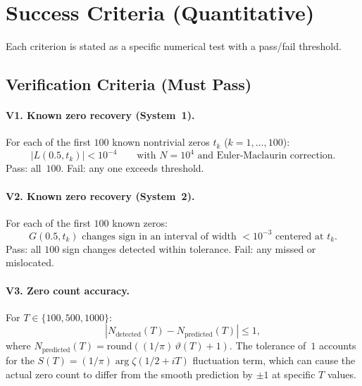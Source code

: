 \section{Success Criteria (Quantitative)}
\label{sec:criteria}

Each criterion is stated as a specific numerical test with a pass/fail threshold.


\subsection{Verification Criteria (Must Pass)}
\label{sec:verification}

\paragraph{V1. Known zero recovery (System~1).}
For each of the first $100$ known nontrivial zeros $t_k$ ($k = 1, \ldots, 100$):
\begin{equation}\label{eq:V1}
  |L(0.5, t_k)| < 10^{-4} \qquad \text{with } N = 10^4
  \text{ and Euler-Maclaurin correction.}
\end{equation}
Pass: all~$100$. Fail: any one exceeds threshold.

\paragraph{V2. Known zero recovery (System~2).}
For each of the first $100$ known zeros:
\begin{equation}\label{eq:V2}
  G(0.5, t_k) \text{ changes sign in an interval of width } < 10^{-3}
  \text{ centered at } t_k.
\end{equation}
Pass: all $100$ sign changes detected within tolerance. Fail: any missed or mislocated.

\paragraph{V3. Zero count accuracy.}
For $T \in \{100, 500, 1000\}$:
\begin{equation}\label{eq:V3}
  |N_{\mathrm{detected}}(T) - N_{\mathrm{predicted}}(T)| \le 1,
\end{equation}
where $N_{\mathrm{predicted}}(T) = \mathrm{round}((1/\pi)\,\vartheta(T) + 1)$. The
tolerance of~$1$ accounts for the $S(T) = (1/\pi)\arg\zeta(1/2 + iT)$ fluctuation term,
which can cause the actual zero count to differ from the smooth prediction by $\pm 1$ at
specific $T$ values.

